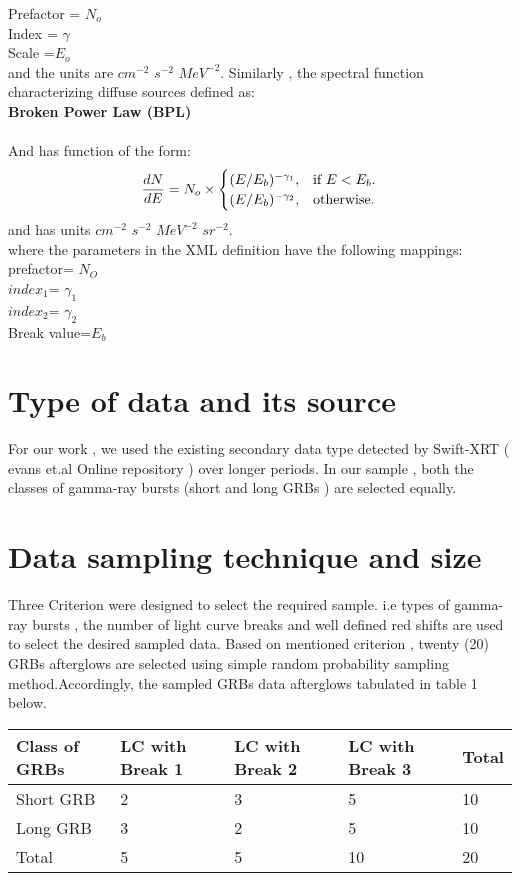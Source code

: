 Prefactor = $N_{o}$\\
Index = $\gamma$\\
Scale =$E_{o}$\\
and the units are $ cm^{-2} $ $s^{-2}$ $ MeV^{-2} $. Similarly , the spectral function characterizing  diffuse sources defined as:\\
\textbf{ Broken Power Law (BPL) }\\\\
And has function of  the form:
\begin{equation}
  \frac{dN}{dE}= N_{o} \times\begin{cases} 
    (E/E_{b}) ^{-\gamma_{1}}, & \text{if $ E < E_{b}$}.\\
    (E/E_{b})^{-\gamma_{2}}, & \text{otherwise}.
  \end{cases}
\end{equation}
and has units $ cm^{-2} $ $s^{-2}$ $ MeV^{-2} $ $ sr^{-2} $.\\
where the parameters in the XML definition have the following mappings:\\
   prefactor= $N_{O}$\\
$ index_{1}$= $\gamma_1 $\\
$index_{2}$= $\gamma_2 $\\
Break value=$ E_b $\\	
\section{Type of data  and its source }
For  our  work , we used  the existing  secondary data type  detected by  Swift-XRT   ( evans et.al Online repository )  over longer periods. In our sample , both the classes of gamma-ray bursts (short and long GRBs ) are selected equally. 
\section{Data sampling technique and size}
Three Criterion were  designed to select the required sample. i.e  types of gamma-ray bursts , the number of light curve breaks and well defined red shifts are used to select the desired sampled  data. Based on mentioned criterion ,  twenty (20) GRBs afterglows are selected using  simple random probability sampling method.Accordingly, the  sampled  GRBs data  afterglows  tabulated in table 1 below.
\begin{center}
	\begin{table}
		\begin{tabular}{|l|l|l|l|l|}
			\hline
			Class of GRBs & LC with Break 1 & LC with Break 2 & LC with Break 3 & Total \\ \hline
			Short GRB & 2 & 3 & 5 & 10 \\ \hline
			Long GRB & 3 & 2 & 5 & 10 \\ \hline
			Total & 5 & 5 & 10 & 20 \\ \hline
		\end{tabular}
	\end{table}
\end{center}
